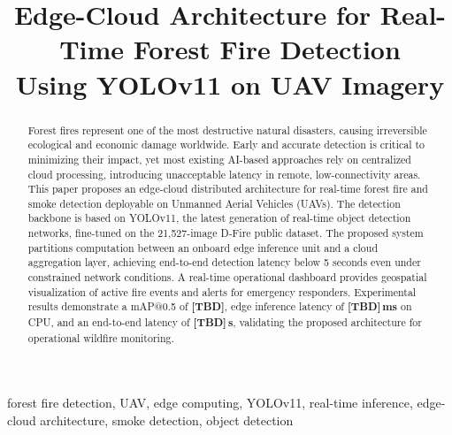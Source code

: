 \documentclass[conference]{IEEEtran}
\begin{document}
\title{Edge-Cloud Architecture for Real-Time Forest Fire Detection\\
Using YOLOv11 on UAV Imagery}

\author{
}

\maketitle

\begin{abstract}
Forest fires represent one of the most destructive natural disasters,
causing irreversible ecological and economic damage worldwide. Early and
accurate detection is critical to minimizing their impact, yet most
existing AI-based approaches rely on centralized cloud processing,
introducing unacceptable latency in remote, low-connectivity areas.
This paper proposes an edge-cloud distributed architecture for
real-time forest fire and smoke detection deployable on Unmanned Aerial
Vehicles (UAVs). The detection backbone is based on YOLOv11, the latest
generation of real-time object detection networks, fine-tuned on the
21,527-image D-Fire public dataset. The proposed system partitions
computation between an onboard edge inference unit and a cloud
aggregation layer, achieving end-to-end detection latency below
5 seconds even under constrained network conditions. A real-time
operational dashboard provides geospatial visualization of active fire
events and alerts for emergency responders. Experimental results
demonstrate a mAP@0.5 of \textbf{[TBD]}, edge inference latency of
\textbf{[TBD]\,ms} on CPU, and an end-to-end latency of
\textbf{[TBD]\,s}, validating the proposed architecture for operational
wildfire monitoring.
\end{abstract}

\begin{IEEEkeywords}
forest fire detection, UAV, edge computing, YOLOv11, real-time
inference, edge-cloud architecture, smoke detection, object detection
\end{IEEEkeywords}

\end{document}
